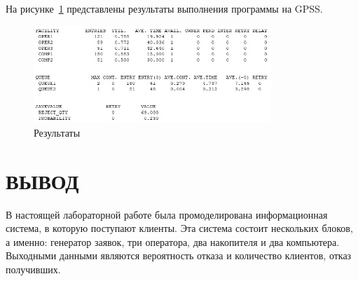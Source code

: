 На рисунке~\ref{img:results} представлены результаты выполнения программы на GPSS.
\begin{figure}[H]
    \centering
    \includegraphics[width=0.8\textwidth]{images/scr01.jpg}
    \caption{Результаты}
    \label{img:results}
\end{figure}

\section*{\hfill{}ВЫВОД\hfill{}}
В настоящей лабораторной работе была промоделирована информационная система, в которую поступают клиенты. Эта система состоит нескольких блоков, а именно: генератор заявок, три оператора, два накопителя и два компьютера. Выходными данными являются вероятность отказа и количество клиентов, отказ получивших.
